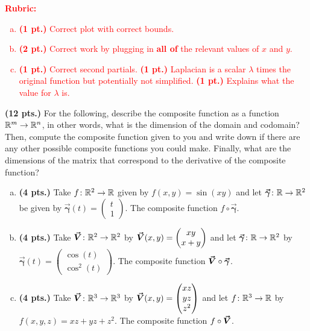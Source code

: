 \documentclass[12pt]{article} %
\newcommand{\curvegamma}{\boldsymbol{\vec{\gamma}}}
\begin{document}
\vspace*{1cm}
\textcolor{red}{
\noindent \textbf{Rubric:}
\begin{enumerate}[(a)]
    \item \textbf{(1 pt.)} Correct plot with correct bounds.
    \item \textbf{(2 pt.)} Correct work by plugging in \textbf{all of} the relevant values of $x$ and $y$. 
    \item \textbf{(1 pt.)} Correct second partials. \textbf{(1 pt.)} Laplacian is a scalar $\lambda$ times the original function but potentially not simplified. \textbf{(1 pt.)} Explains what the value for $\lambda$ is.
\end{enumerate}
}

\newpage

\begin{problem}
\textbf{(12 pts.)} For the following, describe the composite function as a function $\mathbb{R}^m \to \mathbb{R}^n$, in other words, what is the dimension of the domain and codomain? Then, compute the composite function given to you and write down if there are any other possible composite functions you could make. Finally, what are the dimensions of the matrix that correspond to the derivative of the composite function?
\begin{enumerate}[(a)]
\item \textbf{(4 pts.)} Take $f\colon \mathbb{R}^2 \to \mathbb{R}$ given by $f(x,y)=\sin(xy)$ and let $\curvegamma \colon \R \to \R^2$ be given by $\curvegamma(t) = \begin{pmatrix} t \\ 1 \end{pmatrix}$. The composite function $f\circ \curvegamma$.
\item \textbf{(4 pts.)} Take $\boldsymbol{\vec{V}} \colon \mathbb{R}^2 \to \mathbb{R}^2$ by $\boldsymbol{\vec{V}}(x,y)= \begin{pmatrix} xy \\ x+y \end{pmatrix}$ and let $\curvegamma \colon \R \to \R^2$ by $\curvegamma(t) = \begin{pmatrix} \cos(t) \\ \cos^2(t) \end{pmatrix}$. The composite function $\vecfieldV \circ \curvegamma$.
\item \textbf{(4 pts.)} Take $\boldsymbol{\vec{V}} \colon \mathbb{R}^3 \to \mathbb{R}^3$ by $\boldsymbol{\vec{V}}(x,y)= \begin{pmatrix} xz \\ yz \\ z^2 \end{pmatrix}$ and let $f \colon \mathbb{R}^3 \to \mathbb{R}$ by $f(x,y,z) = xz + yz + z^2$. The composite function $f\circ \boldsymbol{\vec{V}}$.
\end{enumerate}
\end{problem}
\end{document}

